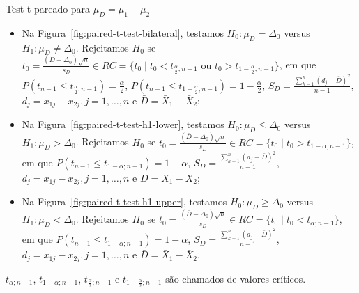 \documentclass[9pt]{beamer}
\begin{document}
\begin{frame}{Test t pareado para $\mu_D = \mu_1 - \mu_2$}

\normalsize

\begin{itemize}
	\item Na Figura~\ref{fig:paired-t-test-bilateral}, testamos $H_0: \mu_D = \Delta_0$ versus $H_1: \mu_D \neq \Delta_0$. Rejeitamos $H_0$ se $t_0 = \frac{(\bar{D} - \Delta_0)\sqrt{n}}{ s_D } \in  RC=\{t_0 \mid t_0 < t_{\frac{\alpha}{2};n-1} \allowbreak \mbox{ ou } t_0 > t_{1-\frac{\alpha}{2};n-1} \}$, em que $P\left(t_{n-1} \leq t_{\frac{\alpha}{2}; n-1} \right) = \frac{\alpha}{2}$, $P\left(t_{n-1} \leq t_{1-\frac{\alpha}{2}; n-1} \right) = 1 - \frac{\alpha}{2}$, $S_D = \frac{\sum_{k=1}^{n}(d_j - \bar{D})^2}{n-1}$, $d_j = x_{1j} - x_{2j}, j=1, \dots, n$ e $\bar{D} = \bar{X}_1 - \bar{X}_2$;
	\vfill
	
	\item Na Figura~\ref{fig:paired-t-test-h1-lower}, testamos $H_0: \mu_D \leq \Delta_0 $ versus $H_1: \mu_D > \Delta_0$. Rejeitamos $H_0$ se $t_0 = \frac{(\bar{D} - \Delta_0)\sqrt{n}}{ s_D } \in \allowbreak RC=\{t_0 \mid t_0 > t_{1-\alpha; n-1}  \}$, em que $P\left(t_{n-1} \leq  t_{1-\alpha;n-1} \right) =1- \alpha$, $S_D = \frac{\sum_{k=1}^{n}(d_j - \bar{D})^2}{n-1}$, $d_j = x_{1j} - x_{2j}, j=1, \dots, n$ e $\bar{D} = \bar{X}_1 - \bar{X}_2$;
	\vfill
	
	\item Na Figura~\ref{fig:paired-t-test-h1-upper}, testamos $H_0: \mu_D \geq \Delta_0$ versus $H_1: \mu_D  < \Delta_0$. Rejeitamos $H_0$ se $t_0 = \frac{(\bar{D} - \Delta_0)\sqrt{n}}{ s_D } \in \allowbreak RC=\{t_0 \mid t_0 < t_{\alpha;n-1}  \}$, em que $P\left(t_{n-1} \leq  t_{1-\alpha;n-1} \right) =1- \alpha$, $S_D = \frac{\sum_{k=1}^{n}(d_j - \bar{D})^2}{n-1}$, $d_j = x_{1j} - x_{2j}, j=1, \dots, n$ e $\bar{D} = \bar{X}_1 - \bar{X}_2$.
\end{itemize}
$t_{\alpha;n-1}$, $t_{1-\alpha;n-1}$, $t_{\frac{\alpha}{2};n-1}$ e $t_{1-\frac{\alpha}{2};n-1}$ são chamados de valores críticos. 

\normalsize

\end{frame}
\end{document}
